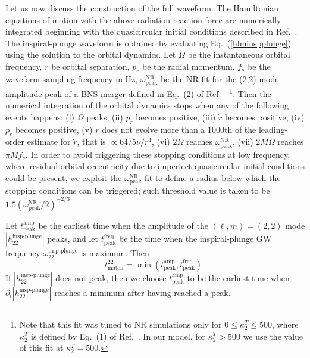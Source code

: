 \documentclass[prd,aps,letter,twocolumn,floatfix,notitlepage,nofootinbib]{revtex4-1}
\begin{document}
Let us now discuss the construction of the full waveform. The Hamiltonian equations of motion with the above radiation-reaction force are numerically integrated beginning with the quasicircular initial conditions described in Ref.~\cite{Buonanno:2005xu}. The inspiral-plunge waveform is obtained by evaluating Eq.~(\ref{hlminspplunge}) using the solution to the orbital dynamics. Let $\Omega$ be the instantaneous orbital frequency, $r$ be orbital separation, $p_r$ be the radial momentum, $f_s$ be the waveform sampling frequency in Hz, $\omega_{\textrm{peak}}^{\textrm{NR}}$ be the NR fit for the (2,2)-mode amplitude peak of a BNS merger defined in Eq.~(2) of Ref.~\cite{Bernuzzi:2015rla}~\footnote{Note that this fit was tuned to NR simulations only for $0 \leq \kappa_2^T \leq 500$, where $\kappa_2^T$ is defined by Eq.~(1) of Ref.~\cite{Bernuzzi:2015rla}. In our model, for $\kappa_2^T >500$ we use the value of this fit at $\kappa_2^T=500$.}. Then the numerical integration of the orbital dynamics stops when any of the following events happens: (i) $\Omega$ peaks, (ii) $p_r$ becomes positive, (iii) $\dot{r}$ becomes positive, (iv) $\dot{p}_r$ becomes positive, (v) $r$ does not evolve more than a 1000th of the leading-order estimate for $\dot{r}$, that is $\propto 64/5 \nu/r^4$, (vi) $2\Omega$ reaches $\omega_{\textrm{peak}}^{\textrm{NR}}$, (vii) $2M\Omega$ reaches $\pi M f_s$. In order to avoid triggering these stopping conditions at low frequency, where residual orbital eccentricity due to imperfect quasicircular initial conditions could be present, we exploit the $\omega_{\textrm{peak}}^{\textrm{NR}}$ fit to define a radius below which the stopping conditions can be triggered; such threshold value is taken to be $1.5 (\omega_{\textrm{peak}}^{\textrm{NR}}/2)^{-2/3}$.  

Let $t_{\textrm{peak}}^{\textrm{amp}}$ be the earliest time when the amplitude of the $(\ell,m)=(2,2)$ mode $|h_{22}^{\textrm{insp-plunge}}|$ peaks, and let $t_{\textrm{peak}}^{\textrm{freq}}$ be the time when the inspiral-plunge GW frequency $\omega_{22}^{\textrm{insp-plunge}}$ is maximum. Then
\begin{equation}
t_{\textrm{match}}^{22} = \min \left(t_{\textrm{peak}}^{\textrm{amp}},t_{\textrm{peak}}^{\textrm{freq}}\right)\,.\label{tmatch}
\end{equation}
If $|h_{22}^{\textrm{insp-plunge}}|$  does not peak, then we choose $t_{\textrm{peak}}^{\textrm{amp}}$ to be the earliest time when $\partial_t |h_{22}^{\textrm{insp-plunge}}|$ reaches a minimum after having reached a peak.
\end{document}
